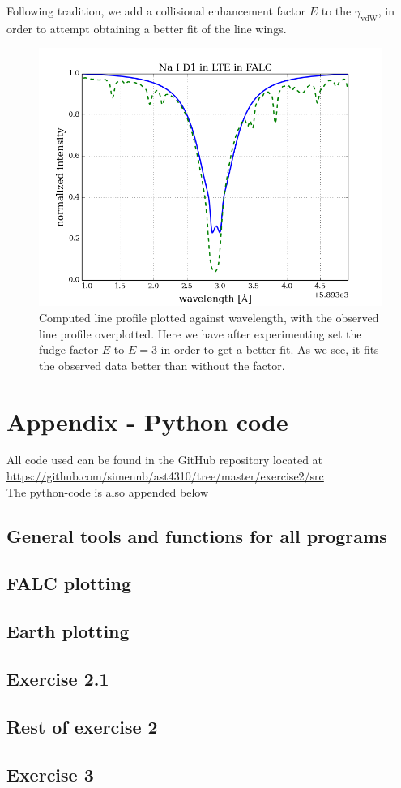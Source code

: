 \documentclass{article}
\begin{document}
Following tradition, we add a collisional enhancement factor $E$ to the $\gamma_{\text{vdW}}$, in order to attempt obtaining a better fit of the line wings.
\begin{figure}[H]
  \centering
  \includegraphics[scale=0.5]{../figures/task3/Na_D1.png}
  \caption{Computed line profile plotted against wavelength, with the observed line profile overplotted. Here we have after experimenting set the fudge factor $E$ to $E=3$ in order to get a better fit. As we see, it fits the observed data better than without the factor.}
\end{figure}
\section{Appendix - Python code}
All code used can be found in the GitHub repository located at\\\href{https://github.com/simennb/ast4310/tree/master/exercise2/src}{https://github.com/simennb/ast4310/tree/master/exercise2/src}
\\The python-code is also appended below
\subsection{General tools and functions for all programs}

\subsection{FALC plotting}

\subsection{Earth plotting}

\subsection{Exercise 2.1}

\subsection{Rest of exercise 2}

\subsection{Exercise 3}

\end{document}
